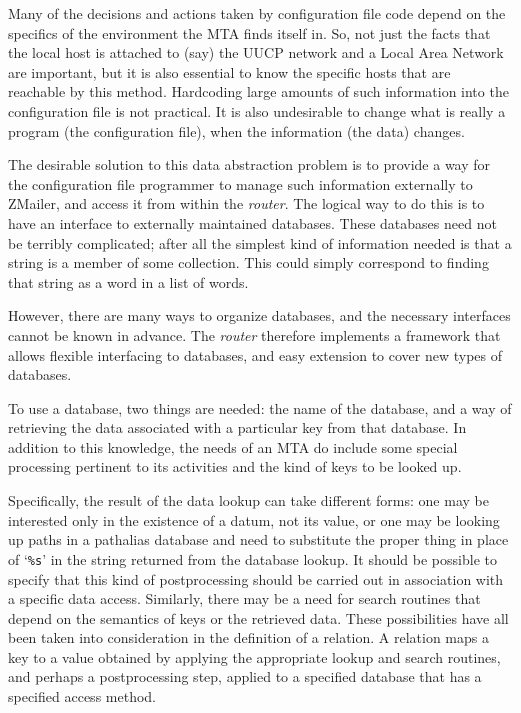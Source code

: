 Many of the decisions and actions taken by configuration file code depend
on the specifics of the environment the MTA finds itself in.  So, not just
the facts that the local host is attached to (say) the UUCP network and a
Local Area Network are important, but it is also essential to know the specific
hosts that are reachable by this method.  Hardcoding large amounts of such
information into the configuration file is not practical.  It is also
undesirable to change what is really a program (the configuration file),
when the information (the data) changes.

The desirable solution to this data abstraction problem is to provide a way
for the configuration file programmer to manage such information externally
to ZMailer, and access it from within the {\em router\/}.  The logical way to do
this is to have an interface to externally maintained databases.  These
databases need not be terribly complicated; after all the simplest kind of
information needed is that a string is a member of some collection.  This
could simply correspond to finding that string as a word in a list of
words.

However, there are many ways to organize databases, and the necessary
interfaces cannot be known in advance.  The {\em router\/} therefore implements a
framework that allows flexible interfacing to databases, and easy extension
to cover new types of databases.

To use a database, two things are needed: the name of the database, and a
way of retrieving the data associated with a particular key from that
database.  In addition to this knowledge, the needs of an MTA do include
some special processing pertinent to its activities and the kind of keys to
be looked up.

Specifically, the result of the data lookup can take different forms: one
may be interested only in the existence of a datum, not its value, or one
may be looking up paths in a pathalias database and need to substitute the
proper thing in place of `{\tt \%s}' in the string returned from the database
lookup.  It should be possible to specify that this kind of postprocessing
should be carried out in association with a specific data access.
Similarly, there may be a need for search routines that depend on the
semantics of keys or the retrieved data.  These possibilities have all been
taken into consideration in the definition of a relation.  A relation maps
a key to a value obtained by applying the appropriate lookup and search
routines, and perhaps a postprocessing step, applied to a specified
database that has a specified access method.

